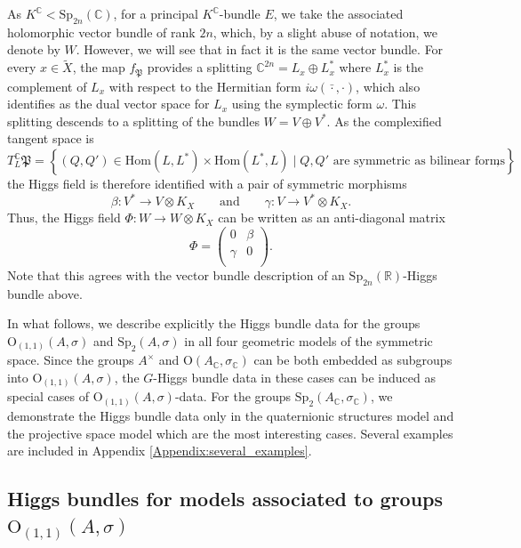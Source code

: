 \documentclass[oneside,11pt]{amsart}
\theoremstyle{definition}
\theoremstyle{remark}
\numberwithin{thm}{section}
\numberwithin{equation}{section}
\begin{document}
As $K^\mathbb C<\mathrm{Sp}_{2n}(\mathbb C)$, for a principal $K^\mathbb C$-bundle $E$, we take the associated holomorphic vector bundle of rank $2n$, which, by a slight abuse of notation, we denote by $W$. However, we will see that in fact it is the same vector bundle. For every $x\in\tilde X$, the map $f_\mathfrak P$ provides a splitting $\mathbb C^{2n}=L_x\oplus L_x^*$ where $L_x^*$ is the complement of $L_x$ with respect to the Hermitian form $i\omega(\bar\cdot,\cdot)$, which also identifies as the dual vector space for $L_x$ using the symplectic form $\omega$. This splitting descends to a splitting of the bundles $W=V\oplus V^*$. As the complexified tangent space is
$$T_L^\mathbb C\mathfrak P=\left\{(Q,Q') \in\mathrm{Hom}(L,L^*)\times\mathrm{Hom}(L^*,L)\mid Q,Q'\text{ are symmetric as bilinear forms}\right\},$$
the Higgs field is therefore identified with a pair of symmetric morphisms
\[
\beta:V^*\to V\otimes K_X \qquad \text{and} \qquad 
\gamma:V\to V^*\otimes K_X.
\]
Thus, the Higgs field $\Phi\colon W\to W\otimes K_X$ can be written as an anti-diagonal matrix
$$\Phi=\begin{pmatrix}
   0 & \beta   \\
   \gamma  & 0  \\
\end{pmatrix}.$$
Note that this agrees with the vector bundle description of an $\mathrm{Sp}_{2n}(\mathbb R)$-Higgs bundle above.

In what follows, we describe explicitly the Higgs bundle data for the groups $\mathrm{O}_{(1,1)}(A, \sigma)$ and $\mathrm{Sp}_2(A, \sigma)$ in all four geometric models of the symmetric space. Since the groups $A^{\times}$ and $\mathrm{O}(A_{\mathbb{C}}, \sigma_{\mathbb{C}})$ can be both embedded as subgroups into $\mathrm{O}_{(1,1)}(A,\sigma)$, the $G$-Higgs bundle data in these cases can be induced as special cases of $\mathrm{O}_{(1,1)}(A,\sigma)$-data. For the groups $\mathrm{Sp}_2(A_{\mathbb{C}}, \sigma_{\mathbb{C}})$, we demonstrate the Higgs bundle data only in the quaternionic structures model and the projective space model which are the most interesting cases. Several examples are included in Appendix \ref{Appendix:several_examples}. 


\subsection{Higgs bundles for models associated to groups \texorpdfstring{$\mathrm{O}_{(1,1)}(A,\sigma)$}{} }\label{subsec:indefi_defs}
\end{document}
